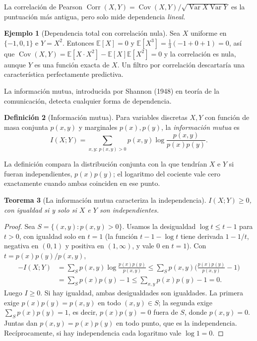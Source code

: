 \documentclass[11pt]{article}
\newtheorem{teorema}{Teorema}[section]
\theoremstyle{definition}
\newtheorem{definicion}[teorema]{Definición}
\newtheorem{ejemplo}[teorema]{Ejemplo}
\theoremstyle{remark}
\newcommand{\E}{\mathbb{E}}
\DeclareMathOperator{\Var}{Var}
\DeclareMathOperator{\Cov}{Cov}
\DeclareMathOperator{\Corr}{Corr}
\begin{document}
\medskip

\noindent La correlación de Pearson $\Corr(X,Y)=\Cov(X,Y)/\sqrt{\Var X\Var Y}$ es la puntuación más antigua, pero solo mide dependencia \emph{lineal}.

\begin{ejemplo}[Dependencia total con correlación nula]\label{ej:corr-nula}
\noindent Sea $X$ uniforme en $\{-1,0,1\}$ e $Y=X^2$. Entonces $\E[X]=0$ y $\E[X^3]=\frac13(-1+0+1)=0$, así que $\Cov(X,Y)=\E[X\cdot X^2]-\E[X]\E[X^2]=0$ y la correlación es nula, aunque $Y$ es una función exacta de $X$. Un filtro por correlación descartaría una característica perfectamente predictiva.
\end{ejemplo}

\noindent La información mutua, introducida por Shannon (1948) en teoría de la comunicación, detecta cualquier forma de dependencia.

\begin{definicion}[Información mutua]\label{def:im}
\noindent Para variables discretas $X,Y$ con función de masa conjunta $p(x,y)$ y marginales $p(x),p(y)$, la \emph{información mutua} es
\[
I(X;Y)=\sum_{x,y:\,p(x,y)>0}p(x,y)\log\frac{p(x,y)}{p(x)p(y)}.
\]
\end{definicion}

\noindent La definición compara la distribución conjunta con la que tendrían $X$ e $Y$ si fueran independientes, $p(x)p(y)$; el logaritmo del cociente vale cero exactamente cuando ambas coinciden en ese punto.

\begin{teorema}[La información mutua caracteriza la independencia]\label{teo:im}
\noindent $I(X;Y)\ge0$, con igualdad si y solo si $X$ e $Y$ son independientes.
\end{teorema}
\begin{proof}
\noindent Sea $S=\{(x,y):p(x,y)>0\}$. Usamos la desigualdad $\log t\le t-1$ para $t>0$, con igualdad solo en $t=1$ (la función $t-1-\log t$ tiene derivada $1-1/t$, negativa en $(0,1)$ y positiva en $(1,\infty)$, y vale $0$ en $t=1$). Con $t=p(x)p(y)/p(x,y)$,
\begin{align*}
-I(X;Y)&=\sum_{S}p(x,y)\log\frac{p(x)p(y)}{p(x,y)}\le\sum_{S}p(x,y)\Big(\frac{p(x)p(y)}{p(x,y)}-1\Big)\\
&=\sum_Sp(x)p(y)-1\le\sum_{x,y}p(x)p(y)-1=0.
\end{align*}
Luego $I\ge0$. Si hay igualdad, ambas desigualdades son igualdades. La primera exige $p(x)p(y)=p(x,y)$ en todo $(x,y)\in S$; la segunda exige $\sum_{S}p(x)p(y)=1$, es decir, $p(x)p(y)=0$ fuera de $S$, donde $p(x,y)=0$. Juntas dan $p(x,y)=p(x)p(y)$ en todo punto, que es la independencia. Recíprocamente, si hay independencia cada logaritmo vale $\log1=0$.
\end{proof}
\end{document}
